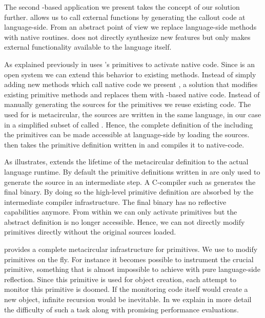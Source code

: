\noindent The second \B-based application we present takes the concept of our \FFI solution further.
\NB allows us to call external functions by generating the callout code at language-side.
From an abstract point of view we replace language-side methods with native routines.
\NB does not directly synthesize new features but only makes external functionality available to the language itself.

As explained previously in  \B uses \PH's primitives to activate native code.
Since \PH is an open system we can extend this behavior to existing methods.
Instead of simply adding new methods which call native code we present \WF, a solution that modifies existing primitive methods and replaces them with \B-based native code.
Instead of manually generating the sources for the primitives we reuse existing code.
The \VM used for \PH is metacircular, the \VM sources are written in the same language, in our case in a simplified subset of \PH called \Slang.
Hence, the complete definition of the \VM including the primitives can be made accessible at language-side by loading the \VM sources.
\WF then takes the primitive definition written in \Slang and compiles it to native-code.

As  illustrates, \WF extends the lifetime of the metacircular \VM definition to the actual language runtime.
By default the primitive definitions written in \Slang are only used to generate the \VM source in an intermediate step.
A C-compiler such as \GCC generates the final binary.
By doing so the high-level primitive definition are absorbed by the intermediate compiler infrastructure.
The final binary has no reflective capabilities anymore.
From within \PH we can only activate primitives but the abstract definition is no longer accessible.
Hence, we can not directly modify primitives directly without the original \VM sources loaded.

\WF provides a complete metacircular infrastructure for primitives.
We use \WF to modify primitives on the fly.
For instance it becomes possible to instrument the crucial  primitive, something that is almost impossible to achieve with pure language-side reflection.
Since this primitive is used for object creation, each attempt to monitor this primitive is doomed.
If the monitoring code itself would create a new object, infinite recursion would be inevitable.
In  we explain in more detail the difficulty of such a task along with promising performance evaluations.



